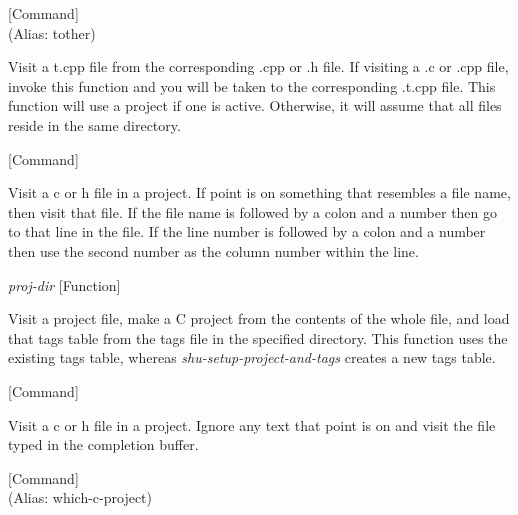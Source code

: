 \vspace{1em}
\noindent
{}
\usebox{\funcname}
 \hfill [Command]\\%
 (Alias: tother)

\begin{doc-string}
Visit a t.cpp file from the corresponding .cpp or .h file.  If visiting a .c
or .cpp file, invoke this function and you will be taken to the corresponding
.t.cpp file.  This function will use a project if one is active.  Otherwise, it
will assume that all files reside in the same directory.
\end{doc-string}

\vspace{1em}
\noindent
{}
\usebox{\funcname}
 \hfill [Command]

\begin{doc-string}
Visit a c or h file in a project.  If point is on something that resembles a file
name, then visit that file.  If the file name is followed by a colon and a number
then go to that line in the file.  If the line number is followed by a colon and
a number then use the second number as the column number within the line.
\end{doc-string}

\vspace{1em}
\noindent
{}
\usebox{\funcname}\emph{proj-dir}
 \hfill [Function]

\begin{doc-string}
Visit a project file, make a C project from the contents of the whole file,
and load that tags table from the tags file in the specified directory.  This
function uses the existing tags table, whereas \emph{shu-setup-project-and-tags}
creates a new tags table.
\end{doc-string}

\vspace{1em}
\noindent
{}
\usebox{\funcname}
 \hfill [Command]

\begin{doc-string}
Visit a c or h file in a project.  Ignore any text that point is on and visit the
file typed in the completion buffer.
\end{doc-string}

\vspace{1em}
\noindent
{}
\usebox{\funcname}
 \hfill [Command]\\%
 (Alias: which-c-project)

